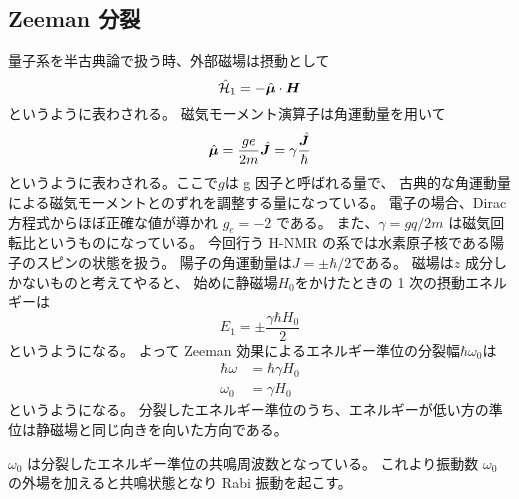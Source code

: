\documentclass[11pt,dvipdfmx,a4paper]{jsarticle}
\begin{document}
\subsection{Zeeman 分裂}
量子系を半古典論で扱う時、外部磁場は摂動として
\begin{equation}
	\hat{\mathcal{H}}_1 = -\hat{\vb*{\mu}}\cdot \vb*{H}
\end{equation}
というように表わされる。
磁気モーメント演算子は角運動量を用いて
\begin{equation}
	\hat{\vb*{\mu}} = \frac{ge}{2m}\hat{\vb*{J}} = \gamma\frac{\hat{\vb*{J}}}{\hbar}
\end{equation}
というように表わされる。ここで\(g\)は g 因子と呼ばれる量で、
古典的な角運動量による磁気モーメントとのずれを調整する量になっている。
電子の場合、Dirac 方程式からほぼ正確な値が導かれ \(g_e = - 2\) である。
また、\(\gamma = gq/2m\) は磁気回転比というものになっている。
今回行う H-NMR の系では水素原子核である陽子のスピンの状態を扱う。
陽子の角運動量は\(J=\pm\hbar/2\)である。
磁場は\(z\) 成分しかないものと考えてやると、
始めに静磁場\(H_0\)をかけたときの 1 次の摂動エネルギーは
\begin{equation}
	E_1 = \pm\frac{\gamma\hbar H_0}{2}
\end{equation}
というようになる。
よって Zeeman 効果によるエネルギー準位の分裂幅\(\hbar\omega_0\)は
\begin{align}
	\hbar\omega &= \hbar \gamma H_0\\
	\omega_0 &= \gamma H_0
\end{align}
というようになる。
分裂したエネルギー準位のうち、エネルギーが低い方の準位は静磁場と同じ向きを向いた方向である。

\(\omega_0\) は分裂したエネルギー準位の共鳴周波数となっている。
これより振動数 \(\omega_0\) の外場を加えると共鳴状態となり Rabi 振動を起こす。
\end{document}
